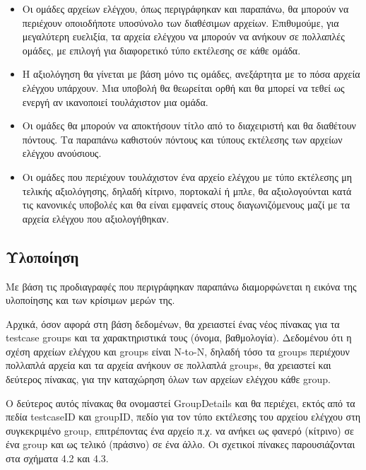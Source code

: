 \documentclass[diploma]{softlab-thesis}
\begin{document}
\begin{itemize}

    \item Οι ομάδες αρχείων ελέγχου, όπως περιγράφηκαν και παραπάνω, θα μπορούν
      να περιέχουν οποιοδήποτε υποσύνολο των διαθέσιμων αρχείων. Επιθυμούμε,
      για μεγαλύτερη ευελιξία, τα αρχεία ελέγχου να μπορούν να ανήκουν σε
      πολλαπλές ομάδες, με επιλογή για διαφορετικό τύπο εκτέλεσης σε κάθε ομάδα.

    \item Η αξιολόγηση θα γίνεται με βάση μόνο τις ομάδες, ανεξάρτητα με το
      πόσα αρχεία ελέγχου υπάρχουν. Μια υποβολή θα θεωρείται ορθή και θα μπορεί
      να τεθεί ως ενεργή αν ικανοποιεί τουλάχιστον μια ομάδα.

    \item Οι ομάδες θα μπορούν να αποκτήσουν τίτλο από το διαχειριστή και θα
      διαθέτουν πόντους. Τα παραπάνω καθιστούν πόντους και τύπους
      εκτέλεσης των αρχείων ελέγχου ανούσιους.

    \item Οι ομάδες που περιέχουν τουλάχιστον ένα αρχείο ελέγχου με τύπο εκτέλεσης
      μη τελικής αξιολόγησης, δηλαδή κίτρινο, πορτοκαλί ή μπλε, θα αξιολογούνται
      κατά τις κανονικές υποβολές και θα είναι εμφανείς στους διαγωνιζόμενους
      μαζί με τα αρχεία ελέγχου που αξιολογήθηκαν.

\end{itemize}

\subsection{Υλοποίηση}

Με βάση τις προδιαγραφές που περιγράφηκαν παραπάνω διαμορφώνεται η εικόνα της
υλοποίησης και των κρίσιμων μερών της.

\bigskip

Αρχικά, όσον αφορά στη βάση δεδομένων, θα χρειαστεί ένας νέος πίνακας για τα
testcase groups και τα χαρακτηριστικά τους (όνομα, βαθμολογία). Δεδομένου ότι η
σχέση αρχείων ελέγχου και groups είναι N-to-N, δηλαδή τόσο τα groups περιέχουν
πολλαπλά αρχεία και τα αρχεία ανήκουν σε πολλαπλά groups, θα χρειαστεί και
δεύτερος πίνακας, για την καταχώρηση όλων των αρχείων ελέγχου κάθε group.

\bigskip

Ο δεύτερος αυτός πίνακας θα ονομαστεί GroupDetails και θα περιέχει, εκτός από
τα πεδία testcaseID και groupID, πεδίο για τον τύπο εκτέλεσης του αρχείου
ελέγχου στη συγκεκριμένο group, επιτρέποντας ένα αρχείο π.χ. να ανήκει ως
φανερό (κίτρινο) σε ένα group και ως τελικό (πράσινο) σε ένα άλλο. Οι σχετικοί
πίνακες παρουσιάζονται στα σχήματα 4.2 και 4.3.
\end{document}
